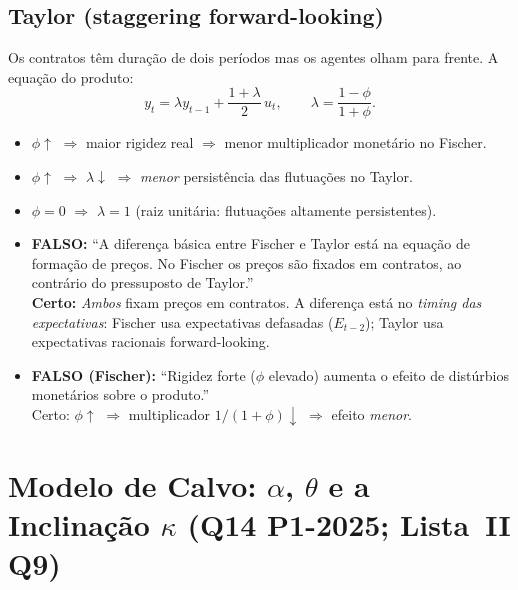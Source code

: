 \documentclass[12pt, a4paper]{article}
\begin{document}
\subsection{Taylor (staggering forward-looking)}

Os contratos têm duração de dois períodos mas os agentes olham para frente. A equação do produto:
\[
  y_t = \lambda y_{t-1} + \frac{1+\lambda}{2}\,u_t, \qquad \lambda = \frac{1-\phi}{1+\phi}.
\]

\begin{fatorbox}[title={Papel de $\phi$ nos dois modelos}]
\begin{itemize}[leftmargin=*]
  \item $\phi\uparrow$ $\Rightarrow$ maior rigidez real $\Rightarrow$ menor multiplicador monetário no Fischer.
  \item $\phi\uparrow$ $\Rightarrow$ $\lambda\downarrow$ $\Rightarrow$ \emph{menor} persistência das flutuações no Taylor.
  \item $\phi = 0$ $\Rightarrow$ $\lambda = 1$ (raiz unitária: flutuações altamente persistentes).
\end{itemize}
\end{fatorbox}

\begin{armbox}[title={Armadilha clássica (Q13)}]
\begin{itemize}[leftmargin=*]
  \item \textbf{FALSO:} ``A diferença básica entre Fischer e Taylor está na equação de formação de preços. No Fischer os preços são fixados em contratos, ao contrário do pressuposto de Taylor.'' \\ \textbf{Certo:} \emph{Ambos} fixam preços em contratos. A diferença está no \emph{timing das expectativas}: Fischer usa expectativas defasadas ($E_{t-2}$); Taylor usa expectativas racionais forward-looking.
  \item \textbf{FALSO (Fischer):} ``Rigidez forte ($\phi$ elevado) aumenta o efeito de distúrbios monetários sobre o produto.'' \\ Certo: $\phi\uparrow$ $\Rightarrow$ multiplicador $1/(1+\phi)\downarrow$ $\Rightarrow$ efeito \emph{menor}.
\end{itemize}
\end{armbox}

\section{Modelo de Calvo: $\alpha$, $\theta$ e a Inclinação $\kappa$ (Q14 P1-2025; Lista~II Q9)}
\end{document}
